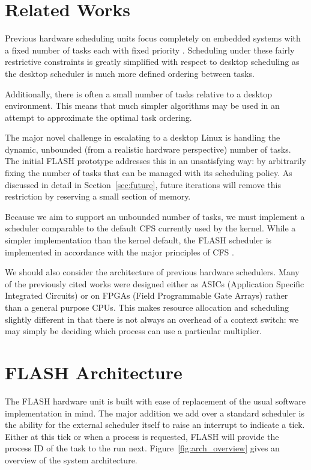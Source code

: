 \documentclass{sig-alternate-10pt}
\begin{document}
\section{Related Works}
\label{sec:related_works}
Previous hardware scheduling units focus completely on embedded systems with
a fixed number of tasks each with fixed priority
\cite{kuacharoen2003configurable, morton2004hardware, nacul2007hardware,
nakano1995hardware, park2008hardware}.  Scheduling under these fairly
restrictive constraints is greatly simplified with respect to desktop
scheduling as the desktop scheduler is much more defined ordering between
tasks.

Additionally, there is often a small number of tasks relative to a desktop
environment.  This means that much simpler algorithms may be used in an
attempt to approximate the optimal task ordering.

The major novel challenge in escalating to a desktop Linux is handling the
dynamic, unbounded (from a realistic hardware perspective) number of tasks.
The initial FLASH prototype addresses this in an unsatisfying way: by
arbitrarily fixing the number of tasks that can be managed with its
scheduling policy.  As discussed in detail in Section~\ref{sec:future},
future iterations will remove this restriction by reserving a small section
of memory.

Because we aim to support an unbounded number of tasks, we must implement
a scheduler comparable to the default CFS currently used by the kernel.
While a simpler implementation than the kernel default, the FLASH scheduler
is implemented in accordance with the major principles of CFS
\cite{wong2008cfs}.

We should also consider the architecture of previous hardware schedulers.
Many of the previously cited works were designed either as ASICs
(Application Specific Integrated Circuits) or on FPGAs (Field Programmable
Gate Arrays) rather than a general purpose CPUs.  This makes resource
allocation and scheduling slightly different in that there is not always an
overhead of a context switch: we may simply be deciding which process can
use a particular multiplier.


\section{FLASH Architecture}
\label{sec:arch}
The FLASH hardware unit is built with ease of replacement of the usual
software implementation in mind.  The major addition we add over a standard
scheduler is the ability for the external scheduler itself to raise an
interrupt to indicate a tick. Either at this tick or when a process is
requested, FLASH will provide the process ID of the task to the run next.
Figure~\ref{fig:arch_overview} gives an overview of the system architecture.
\end{document}
